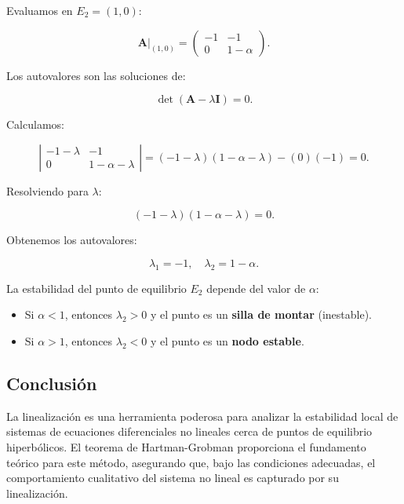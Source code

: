 \documentclass[12pt, a4paper]{report}
\begin{document}
Evaluamos en \( E_2 = (1, 0) \):

\begin{equation}
    \mathbf{A}|_{(1,0)} =
    \begin{pmatrix}
        -1 & -1 \\
        0 & 1 - \alpha
    \end{pmatrix}.
\end{equation}

Los autovalores son las soluciones de:

\begin{equation}
    \det(\mathbf{A} - \lambda \mathbf{I}) = 0.
\end{equation}

Calculamos:

\begin{equation}
    \left| \begin{array}{cc}
        -1 - \lambda & -1 \\
        0 & 1 - \alpha - \lambda
    \end{array} \right| = (-1 - \lambda)(1 - \alpha - \lambda) - (0)(-1) = 0.
\end{equation}

Resolviendo para \( \lambda \):

\begin{equation}
    (-1 - \lambda)(1 - \alpha - \lambda) = 0.
\end{equation}

Obtenemos los autovalores:

\begin{equation}
    \lambda_1 = -1, \quad \lambda_2 = 1 - \alpha.
\end{equation}

La estabilidad del punto de equilibrio \( E_2 \) depende del valor de \( \alpha \):

\begin{itemize}
    \item Si \( \alpha < 1 \), entonces \( \lambda_2 > 0 \) y el punto es un \textbf{silla de montar} (inestable).
    \item Si \( \alpha > 1 \), entonces \( \lambda_2 < 0 \) y el punto es un \textbf{nodo estable}.
\end{itemize}

\subsection{Conclusión}

La linealización es una herramienta poderosa para analizar la estabilidad local de sistemas de ecuaciones diferenciales no lineales cerca de puntos de equilibrio hiperbólicos. El teorema de Hartman-Grobman proporciona el fundamento teórico para este método, asegurando que, bajo las condiciones adecuadas, el comportamiento cualitativo del sistema no lineal es capturado por su linealización.
\end{document}
